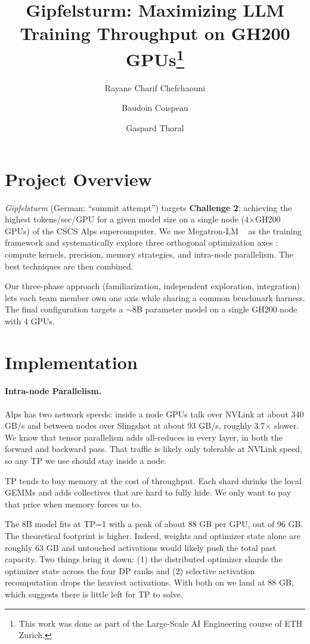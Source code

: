 \documentclass[10pt,twocolumn,letterpaper]{article}
\title{Gipfelsturm: Maximizing LLM Training Throughput on GH200 GPUs\thanks{This work was done as part of the Large-Scale AI Engineering course of ETH Zurich.}}
\author{
Rayane Charif Chefchaouni
\and
Baudoin Coispeau
\and
Gaspard Thoral
}
\begin{document}
\maketitle


\section{Project Overview}
\label{sec:intro}

\textit{Gipfelsturm} (German: ``summit attempt'') targets \textbf{Challenge 2}: achieving the highest tokens/sec/GPU for a given model size on a single node (4$\times$GH200 GPUs) of the CSCS Alps supercomputer. We use Megatron-LM ~\cite{shoeybi2019megatron} as the training framework and systematically explore three orthogonal optimization axes : compute kernels, precision, memory strategies, and intra-node parallelism. The best techniques are then combined.

Our three-phase approach (familiarization, independent exploration, integration) lets each team member own one axis while sharing a common benchmark harness. The final configuration targets a $\sim$8B parameter model on a single GH200 node with 4 GPUs.


\section{Implementation}
\label{sec:implementation}

\paragraph{Intra-node Parallelism.}

Alps has two network speeds: inside a node GPUs talk over NVLink at about 340 GB/s and between nodes over Slingshot at about 93 GB/s, roughly 3.7$\times$ slower. We know that tensor parallelism adds all-reduces in every layer, in both the forward and backward pass. That traffic is likely only tolerable at NVLink speed, so any TP we use should stay inside a node.

TP tends to buy memory at the cost of throughput. Each shard shrinks the local GEMMs and adds collectives that are hard to fully hide. We only want to pay that price when memory forces us to.

The 8B model fits at TP=1 with a peak of about 88 GB per GPU, out of 96 GB. The theoretical footprint is higher. Indeed, weights and optimizer state alone are roughly 63 GB and untouched activations would likely push the total past capacity. Two things bring it down: (1) the distributed optimizer shards the optimizer state across the four DP ranks and (2) selective activation recomputation drops the heaviest activations. With both on we land at 88 GB, which suggests there is little left for TP to solve.
\end{document}
